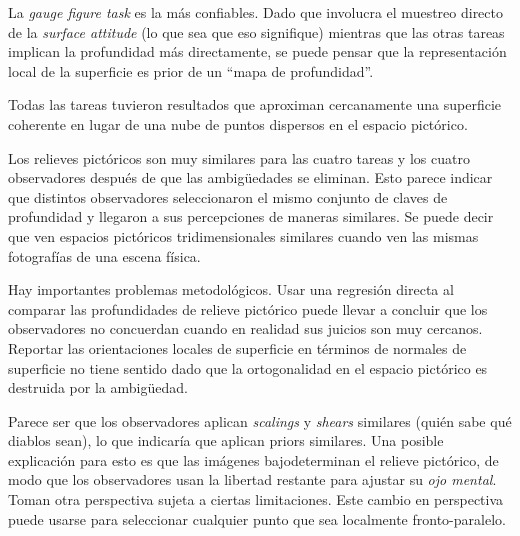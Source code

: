 \documentclass[a4paper,12pt]{article}
\begin{document}
La {\itshape gauge figure task} es la más confiables. Dado que involucra el muestreo directo de la {\itshape surface attitude} (lo que sea que eso signifique) mientras que las otras tareas implican la profundidad más directamente, se puede pensar que la representación local de la superficie es prior de un ``mapa de profundidad''.

Todas las tareas tuvieron resultados que aproximan cercanamente una superficie coherente en lugar de una nube de puntos dispersos en el espacio pictórico. 

Los relieves pictóricos son muy similares para las cuatro tareas y los cuatro observadores después de que las ambigüedades se eliminan. Esto parece indicar que distintos observadores seleccionaron el mismo conjunto de claves de profundidad y llegaron a sus percepciones de maneras similares. Se puede decir que ven espacios pictóricos tridimensionales similares cuando ven las mismas fotografías de una escena física. 

Hay importantes problemas metodológicos. Usar una regresión directa al comparar las profundidades de relieve pictórico puede llevar a concluir que los observadores no concuerdan cuando en realidad sus juicios son muy cercanos. Reportar las orientaciones locales de superficie en términos de normales de superficie no tiene sentido dado que la ortogonalidad en el espacio pictórico es destruida por la ambigüedad. 

Parece ser que los observadores aplican {\itshape scalings} y {\itshape shears} similares (quién sabe qué diablos sean), lo que indicaría que aplican priors similares. Una posible explicación para esto es que las imágenes bajodeterminan el relieve pictórico, de modo que los observadores usan la libertad restante para ajustar su {\itshape ojo mental}. Toman otra perspectiva sujeta a ciertas limitaciones. Este cambio en perspectiva puede usarse para seleccionar cualquier punto que sea localmente fronto-paralelo. 
\end{document}
